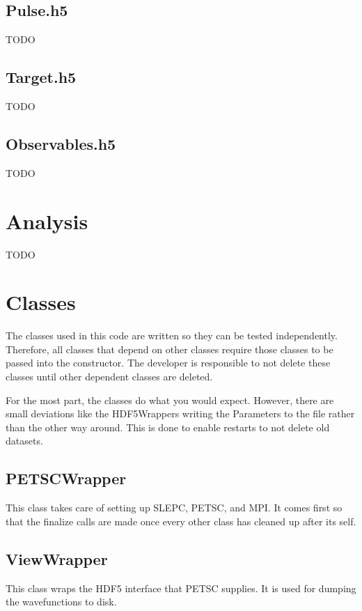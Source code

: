 \documentclass{article}
\begin{document}
\subsection{Pulse.h5} %
\label{sub:pulse_h5}
TODO

\subsection{Target.h5} %
\label{sub:target_h5}
TODO

\subsection{Observables.h5} %
\label{sub:observables_h5}
TODO


\section{Analysis} %
\label{sec:analysis}
TODO



\section{Classes} %
\label{sec:classes}

The classes used in this code are written so they can be tested independently. Therefore, all classes that depend on other classes require those classes to be passed into the constructor. The developer is responsible to not delete these classes until other dependent classes are deleted.

For the most part, the classes do what you would expect. However, there are small deviations like the HDF5Wrappers writing the Parameters to the file rather than the other way around. This is done to enable restarts to not delete old datasets.

\subsection{PETSCWrapper} %
\label{sub:petscwrapper}
This class takes care of setting up SLEPC, PETSC, and MPI. It comes first so that the finalize calls are made once every other class has cleaned up after its self.

\subsection{ViewWrapper} %
\label{sub:viewwrapper}
This class wraps the HDF5 interface that PETSC supplies. It is used for dumping the wavefunctions to disk.
\end{document}
